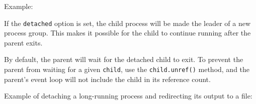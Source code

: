 Example:

\begin{Shaded}
\begin{Highlighting}[]
 \NormalTok{;}

\NormalTok{, [], \{ }\NormalTok{: } \NormalTok{\});}

\NormalTok{, [], \{ }\NormalTok{: [}\NormalTok{, }\NormalTok{, }\NormalTok{] \});}

\NormalTok{, [], \{ }\NormalTok{: [}\NormalTok{] \});}
\end{Highlighting}
\end{Shaded}

If the \texttt{detached} option is set, the child process will be made
the leader of a new process group. This makes it possible for the child
to continue running after the parent exits.

By default, the parent will wait for the detached child to exit. To
prevent the parent from waiting for a given \texttt{child}, use the
\texttt{child.unref()} method, and the parent's event loop will not
include the child in its reference count.

Example of detaching a long-running process and redirecting its output
to a file:

\begin{Shaded}
\begin{Highlighting}[]
  \NormalTok{),}
     \NormalTok{,}
     \NormalTok{(}\NormalTok{, }\NormalTok{),}
     \NormalTok{(}\NormalTok{, }\NormalTok{);}

  \NormalTok{, [], \{}
   \NormalTok{: }\NormalTok{,}
   \NormalTok{: [ }\NormalTok{, out, err ]}
 \NormalTok{\});}

 \NormalTok{();}
\end{Highlighting}
\end{Shaded}

